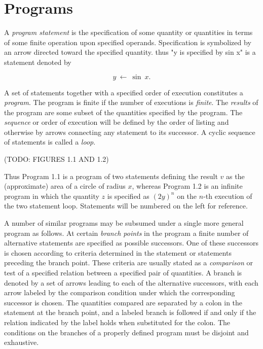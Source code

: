 \section{Programs}

\par A \textit{program statement} is the specification of some quantity or quantities in terms of some finite operation upon specified operands. Specification is symbolized by an arrow directed toward the specified quantity. thus "y is specified by sin x" is a statement denoted by

$$
      y\ ←\ \sin \ x.
$$

\par A set of statements together with a specified order of execution constitutes a \textit{program}. The program is finite if the number of executions is \textit{finite}. The \textit{results} of the program are some subset of the quantities specified by the program. The \textit{sequence} or order of execution will be defined by the order of listing and otherwise by arrows connecting any statement to its successor. A cyclic sequence of statements is called a \textit{loop}.

\par (TODO: FIGURES 1.1 AND 1.2)

\par Thus Program 1.1 is a program of two statements defining the result $v$ as the (approximate) area of a circle of radius $x$, whereas Program 1.2 is an infinite program in which the quantity $z$ is specified as $(2y)^n$ on the $n$-th execution of the two statement loop. Statements will be numbered on the left for reference.

\par A number of similar programs may be subsumed under a single more general program as follows. At certain \textit{branch points} in the program a finite number of alternative statements are specified as possible successors. One of these successors is chosen according to criteria determined in the statement or statements preceding the branch point. These criteria are usually stated as a \textit{comparison} or test of a specified relation between a specified pair of quantities. A branch is denoted by a set of arrows leading to each of the alternative successors, with each arrow labeled by the comparison condition under which the corresponding successor is chosen. The quantities compared are separated by a colon in the statement at the branch point, and a labeled branch is followed if and only if the relation indicated by the label holds when substituted for the colon. The conditions on the branches of a properly defined program must be disjoint and exhaustive.

